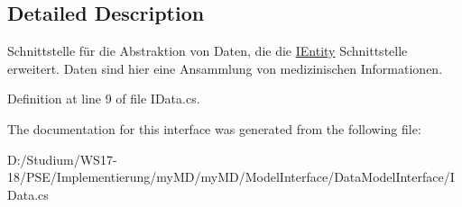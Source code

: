 \subsection{Detailed Description}
Schnittstelle f\"{u}r die Abstraktion von Daten, die die \hyperlink{interfacemy_m_d_1_1_model_interface_1_1_data_model_interface_1_1_i_entity}{IEntity} Schnittstelle erweitert. Daten sind hier eine Ansammlung von medizinischen Informationen. 



Definition at line 9 of file IData.cs.

The documentation for this interface was generated from the following file:\begin{CompactItemize}
\item 
D:/Studium/WS17-18/PSE/Implementierung/my\-MD/my\-MD/Model\-Interface/Data\-Model\-Interface/IData.cs\end{CompactItemize}
